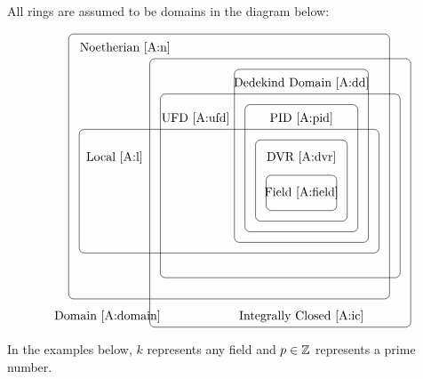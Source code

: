 \documentclass{ximera}
\begin{document}
All rings are assumed to be domains in the diagram below:

\[
\begin{tikzpicture}
\draw[rounded corners] (10,10) rectangle (12,11);
\node at (11,10.5) {Field \ref{A:field}};

\draw[rounded corners] (9.7,9.7) rectangle (12.3,12);
\node at (11,11.5) {DVR \ref{A:dvr}};

\draw[rounded corners] (9.4,9.4) rectangle (12.6,13);
\node at (11,12.6) {PID \ref{A:pid}};

\draw[rounded corners] (9.1,9.1) rectangle (12.9,14);
\node at (11,13.6) {Dedekind Domain \ref{A:dd}};

\draw[rounded corners] (7,8.1) rectangle (13.8,13.3);
\node at (8,12.6) {UFD \ref{A:ufd}};

\draw[rounded corners] (4.7
,8.8) rectangle (13.2,12.3);
\node at (5.7,11.5) {Local \ref{A:l}};

\draw[rounded corners] (4.4,7.5) rectangle (13.5,15);
\node at (6,14.6) {Noetherian \ref{A:n}};

\draw[rounded corners] (6.7,6.7) rectangle (14.1,14.3);
\node at (11,7) {Integrally Closed \ref{A:ic}};

\node at (5.5,7) {Domain \ref{A:domain}};



\end{tikzpicture}
\]


\noindent In the examples below, $k$ represents any field and $p\in\mathbb Z$
represents a prime number.
\end{document}
